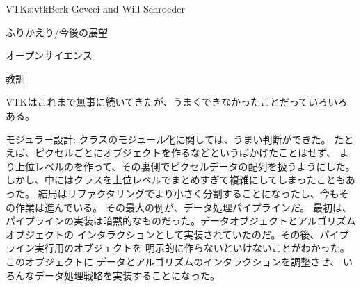 \begin{aosachapter}{VTK}{s:vtk}{Berk Geveci and Will Schroeder}
\begin{aosasect1}{ふりかえり/今後の展望}
\begin{aosasect2}{オープンサイエンス}
\end{aosasect2}

\begin{aosasect2}{教訓}

VTKはこれまで無事に続いてきたが、うまくできなかったことだっていろいろある。

\begin{aosadescription}

  \item{モジュラー設計}: クラスのモジュール化に関しては、うまい判断ができた。
  たとえば、ピクセルごとにオブジェクトを作るなどというばかげたことはせず、
  より上位レベルのを作って、その裏側でピクセルデータの配列を扱うようにした。
  しかし、中にはクラスを上位レベルでまとめすぎて複雑にしてしまったこともあった。
  結局はリファクタリングでより小さく分割することになったし、今もその作業は進んでいる。
  その最大の例が、データ処理パイプラインだ。
  最初は、パイプラインの実装は暗黙的なものだった。データオブジェクトとアルゴリズムオブジェクトの
  インタラクションとして実装されていたのだ。その後、パイプライン実行用のオブジェクトを
  明示的に作らないといけないことがわかった。このオブジェクトに
  データとアルゴリズムのインタラクションを調整させ、
  いろんなデータ処理戦略を実装することになった。


\end{aosadescription}
\end{aosasect2}
\end{aosasect1}
\end{aosachapter}

